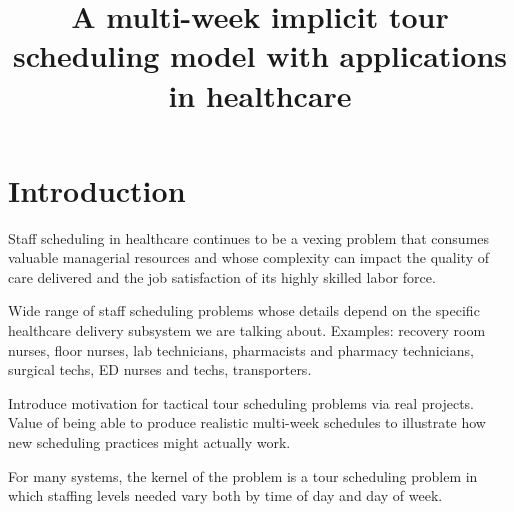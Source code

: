 \documentclass{article}
\begin{document}
\title{A multi-week implicit tour scheduling model with applications in healthcare
}


\author{
}









\section{Introduction}
\label{sec-intro}
Staff scheduling in healthcare continues to be a vexing problem that consumes valuable managerial resources and whose complexity can impact the quality of care delivered and the job satisfaction of its highly skilled labor force. \cite{}

Wide range of staff scheduling problems whose details depend on the specific healthcare delivery subsystem we are talking about. Examples: recovery room nurses, floor nurses, lab technicians, pharmacists and pharmacy technicians, surgical techs, ED nurses and techs, transporters.

Introduce motivation for tactical tour scheduling problems via real projects. Value of being able to produce realistic multi-week schedules to illustrate how new scheduling practices might actually work.

For many systems, the kernel of the problem is a tour scheduling problem in which staffing levels needed vary both by time of day and day of week. 
\end{document}
